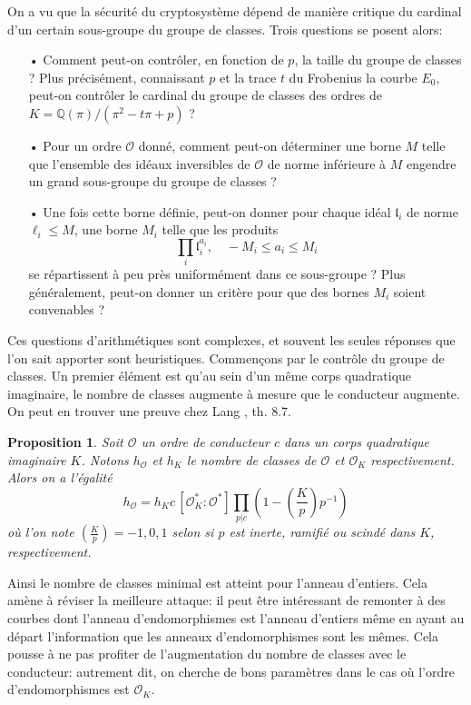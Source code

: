 \documentclass[11pt,a4paper]{article}
\newcommand{\Q}{\mathbb{Q}}
\renewcommand{\O}{\mathcal{O}}
\renewcommand{\frak}{\mathfrak}
\renewcommand{\v}{\vspace{5mm}}
\newtheorem*{prop}{Proposition}
\theoremstyle{definition}
\begin{document}
On a vu que la sécurité du cryptosystème dépend de manière critique du cardinal d'un certain sous-groupe du groupe de classes. Trois questions se posent alors:
\begin{itemize}
\item[•] Comment peut-on contrôler, en fonction de $p$, la taille du groupe de classes ? Plus précisément, connaissant $p$ et la trace $t$ du Frobenius la courbe $E_0$, peut-on contrôler le cardinal du groupe de classes des ordres de $K = \Q(\pi)/(\pi^2 - t\pi + p)$ ?
\item[•] Pour un ordre $\O$ donné, comment peut-on déterminer une borne $M$ telle que l'ensemble des idéaux inversibles de $\O$ de norme inférieure à $M$ engendre un grand sous-groupe du groupe de classes ?
\item[•] Une fois cette borne définie, peut-on donner pour chaque idéal ${\frak l}_i$ de norme $\ell_i\leq M$, une borne $M_i$ telle que les produits
$$\prod_{i} {\frak l}_i^{a_i}, \quad - M_i\leq a_i\leq M_i$$
se répartissent à peu près uniformément dans ce sous-groupe ? Plus généralement, peut-on donner un critère pour que des bornes $M_i$ soient convenables ?
\end{itemize}

\v
Ces questions d'arithmétiques sont complexes, et souvent les seules réponses que l'on sait apporter sont heuristiques. Commençons par le contrôle du groupe de classes. Un premier élément est qu'au sein d'un même corps quadratique imaginaire, le nombre de classes augmente à mesure que le conducteur augmente. On peut en trouver une preuve chez Lang \cite{Lang}, th. 8.7.

\begin{prop}
Soit $\O$ un ordre de conducteur $c$ dans un corps quadratique imaginaire $K$. Notons $h_\O$ et $h_K$ le nombre de classes de $\O$ et $\O_K$ respectivement. Alors on a l'égalité
$$h_\O = h_K c\, [\O_K^*:\O^*] \prod_{p|c} \left(1 - \left(\frac{K}{p}\right)p^{-1}\right)$$
où l'on note $\left(\frac{K}{p}\right) = -1, 0, 1$ selon si $p$ est inerte, ramifié ou scindé dans $K$, respectivement.
\end{prop}

Ainsi le nombre de classes minimal est atteint pour l'anneau d'entiers. Cela amène à réviser la \og meilleure attaque\fg: il peut être intéressant de remonter à des courbes dont l'anneau d'endomorphismes est l'anneau d'entiers même en ayant au départ l'information que les anneaux d'endomorphismes sont les mêmes. Cela pousse à ne pas profiter de l'augmentation du nombre de classes avec le conducteur: autrement dit, on cherche de bons paramètres dans le cas où l'ordre d'endomorphismes est $\O_K$.
\v
\end{document}
